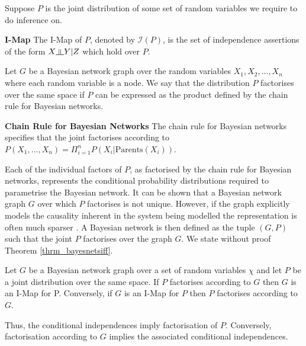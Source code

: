 Suppose $P$ is the joint distribution of some set of random variables we require to do inference on.
\begin{defn}
\textbf{I-Map} The I-Map of $P$, denoted by $\mathcal{I}(P)$, is the set of independence assertions of the form $X \indep Y | Z$ which hold over $P$.
\end{defn} 
Let $G$ be a Bayesian network graph over the random variables $X_1, X_2,...,X_n$ where each random variable is a node. We say that the distribution $P$ factorises over the same space if $P$ can be expressed as the product defined by the chain rule for Bayesian networks.
\begin{defn}
\textbf{Chain Rule for Bayesian Networks} The chain rule for Bayesian networks specifies that the joint factorises according to $P(X_1,...,X_n) = \Pi_{i=1}^n P(X_i | \text{Parents}(X_i))$.
\label{def_chain_rule_bayes}
\end{defn}
Each of the individual factors of $P$, as factorised by the chain rule for Bayesian networks, represents the conditional probability distributions required to parametrise the Bayesian network. It can be shown that a Bayesian network graph $G$ over which $P$ factorises is not unique. However, if the graph explicitly models the causality inherent in the system being modelled the representation is often much sparser \cite{koller}. A Bayesian network is then defined as the tuple $(G, P)$ such that the joint $P$ factorises over the graph $G$. We state without proof Theorem \ref{thrm_bayesnetsiff}. 
\begin{thrm}
Let $G$ be a Bayesian network graph over a set of random variables $\chi$ and let $P$ be a joint distribution over the same space. If $P$ factorises according to $G$ then $G$ is an I-Map for P. Conversely, if $G$ is an I-Map for $P$ then $P$ factorises according to $G$.
\label{thrm_bayesnetsiff}
\end{thrm}
Thus, the conditional independences imply factorisation of $P$. Conversely, factorisation according to $G$ implies the associated conditional independences.

